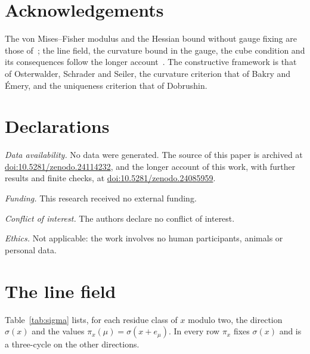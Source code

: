 \section*{Acknowledgements}

The von Mises--Fisher modulus and the Hessian bound without gauge fixing are those
of~\cite{BB26a}; the line field, the curvature bound in the gauge, the cube
condition and its consequences follow the longer account~\cite{BBLR26,BBLRS26}.
The constructive framework is that of Osterwalder, Schrader and Seiler, the
curvature criterion that of Bakry and \'Emery, and the uniqueness criterion
that of Dobrushin.

\section*{Declarations}

\emph{Data availability.} No data were generated. The source of this paper is
archived at
\href{https://doi.org/10.5281/zenodo.24114232}{doi:10.5281/zenodo.24114232}, and
the longer account of this work, with further results and finite checks, at
\href{https://doi.org/10.5281/zenodo.24085959}{doi:10.5281/zenodo.24085959}.

\emph{Funding.} This research received no external funding.

\emph{Conflict of interest.} The authors declare no conflict of interest.

\emph{Ethics.} Not applicable: the work involves no human participants,
animals or personal data.

\appendix

\section{The line field}\label{app:table}

Table~\ref{tab:sigma} lists, for each residue class of $x$ modulo two, the
direction $\sigma(x)$ and the values $\pi_x(\mu)=\sigma(x+e_\mu)$. In every row
$\pi_x$ fixes $\sigma(x)$ and is a three-cycle on the other directions.

